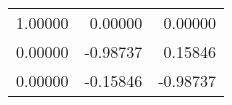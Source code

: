 \begin{tabular}{rrr}
\toprule
1.00000 &  0.00000 &  0.00000 \\
0.00000 & -0.98737 &  0.15846 \\
0.00000 & -0.15846 & -0.98737 \\
\bottomrule
\end{tabular}
